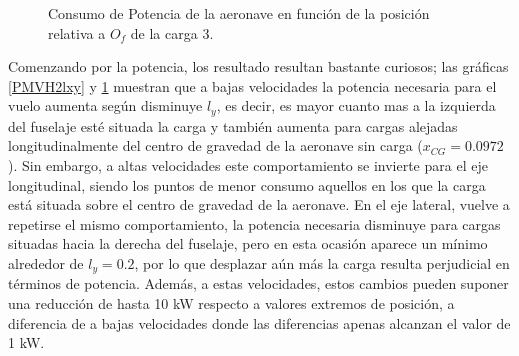 \begin{figure}
	\centering
	\caption{Consumo de Potencia de la aeronave en función de la posición relativa a $O_f$ de la carga 3.}
	\label{PMVH3lxy}
\end{figure}

Comenzando por la potencia, los resultado resultan bastante curiosos; las gráficas \ref{PMVH2lxy} y \ref{PMVH3lxy} muestran que a bajas velocidades la potencia necesaria para el vuelo aumenta según disminuye $l_y$, es decir, es mayor cuanto mas a la izquierda del fuselaje esté situada la carga y también aumenta para cargas alejadas longitudinalmente del centro de gravedad de la aeronave sin carga ($x_{CG}=0.0972$). Sin embargo, a altas velocidades este comportamiento se invierte para el eje longitudinal, siendo los puntos de menor consumo aquellos en los que la carga está situada sobre el centro de gravedad de la aeronave. En el eje lateral, vuelve a repetirse el mismo comportamiento, la potencia necesaria disminuye para cargas situadas hacia la derecha del fuselaje, pero en esta ocasión aparece un mínimo alrededor de $l_y=0.2$, por lo que desplazar aún más la carga resulta perjudicial en términos de potencia. Además, a estas velocidades, estos cambios pueden suponer una reducción de hasta 10 kW respecto a valores extremos de posición, a diferencia de a bajas velocidades donde las diferencias apenas alcanzan el valor de 1 kW.

